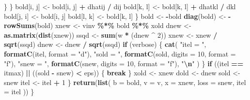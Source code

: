 \documentclass[
  12pt,
]{article}
\newenvironment{Shaded}{\begin{snugshade}}{\end{snugshade}}
\newcommand{\AttributeTok}[1]{\textcolor[rgb]{0.13,0.29,0.53}{#1}}
\newcommand{\ControlFlowTok}[1]{\textcolor[rgb]{0.13,0.29,0.53}{\textbf{#1}}}
\newcommand{\DecValTok}[1]{\textcolor[rgb]{0.00,0.00,0.81}{#1}}
\newcommand{\FunctionTok}[1]{\textcolor[rgb]{0.13,0.29,0.53}{\textbf{#1}}}
\newcommand{\NormalTok}[1]{#1}
\newcommand{\OtherTok}[1]{\textcolor[rgb]{0.56,0.35,0.01}{#1}}
\newcommand{\SpecialCharTok}[1]{\textcolor[rgb]{0.81,0.36,0.00}{\textbf{#1}}}
\newcommand{\StringTok}[1]{\textcolor[rgb]{0.31,0.60,0.02}{#1}}
\begin{document}
\begin{Shaded}
\begin{Highlighting}[]
\NormalTok{          \}}
\NormalTok{        \}}
\NormalTok{        bold[i, j] }\OtherTok{\textless{}{-}}\NormalTok{ bold[i, j] }\SpecialCharTok{+}\NormalTok{ dhatij }\SpecialCharTok{/}\NormalTok{ dij}
\NormalTok{        bold[k, l] }\OtherTok{\textless{}{-}}\NormalTok{ bold[k, l] }\SpecialCharTok{+}\NormalTok{ dhatkl }\SpecialCharTok{/}\NormalTok{ dkl}
\NormalTok{        bold[j, i] }\OtherTok{\textless{}{-}}\NormalTok{ bold[i, j]}
\NormalTok{        bold[l, k] }\OtherTok{\textless{}{-}}\NormalTok{ bold[k, l]}
\NormalTok{      \}}
\NormalTok{      bold }\OtherTok{\textless{}{-}} \SpecialCharTok{{-}}\NormalTok{bold}
      \FunctionTok{diag}\NormalTok{(bold) }\OtherTok{\textless{}{-}} \SpecialCharTok{{-}}\FunctionTok{rowSums}\NormalTok{(bold)}
\NormalTok{      xnew }\OtherTok{\textless{}{-}}\NormalTok{ vinv }\SpecialCharTok{\%*\%}\NormalTok{ bold }\SpecialCharTok{\%*\%}\NormalTok{ xold}
\NormalTok{      dnew }\OtherTok{\textless{}{-}} \FunctionTok{as.matrix}\NormalTok{(}\FunctionTok{dist}\NormalTok{(xnew))}
\NormalTok{      ssqd }\OtherTok{\textless{}{-}} \FunctionTok{sum}\NormalTok{(w }\SpecialCharTok{*}\NormalTok{ (dnew }\SpecialCharTok{\^{}} \DecValTok{2}\NormalTok{))}
\NormalTok{      xnew }\OtherTok{\textless{}{-}}\NormalTok{ xnew }\SpecialCharTok{/} \FunctionTok{sqrt}\NormalTok{(ssqd)}
\NormalTok{      dnew }\OtherTok{\textless{}{-}}\NormalTok{ dnew }\SpecialCharTok{/} \FunctionTok{sqrt}\NormalTok{(ssqd)}
      \ControlFlowTok{if}\NormalTok{ (verbose) \{}
        \FunctionTok{cat}\NormalTok{(}
          \StringTok{"itel = "}\NormalTok{,}
          \FunctionTok{formatC}\NormalTok{(itel, }\AttributeTok{format =} \StringTok{"d"}\NormalTok{),}
          \StringTok{"sold = "}\NormalTok{,}
          \FunctionTok{formatC}\NormalTok{(sold, }\AttributeTok{digits =} \DecValTok{10}\NormalTok{, }\AttributeTok{format =} \StringTok{"f"}\NormalTok{),}
          \StringTok{"snew = "}\NormalTok{,}
          \FunctionTok{formatC}\NormalTok{(snew, }\AttributeTok{digits =} \DecValTok{10}\NormalTok{, }\AttributeTok{format =} \StringTok{"f"}\NormalTok{),}
          \StringTok{"}\SpecialCharTok{\textbackslash{}n}\StringTok{"}
\NormalTok{        )}
\NormalTok{      \}}
      \ControlFlowTok{if}\NormalTok{ ((itel }\SpecialCharTok{==}\NormalTok{ itmax) }\SpecialCharTok{||}\NormalTok{ ((sold }\SpecialCharTok{{-}}\NormalTok{ snew) }\SpecialCharTok{\textless{}}\NormalTok{ eps)) \{}
        \ControlFlowTok{break}
\NormalTok{      \}}
\NormalTok{      xold }\OtherTok{\textless{}{-}}\NormalTok{ xnew}
\NormalTok{      dold }\OtherTok{\textless{}{-}}\NormalTok{ dnew}
\NormalTok{      sold }\OtherTok{\textless{}{-}}\NormalTok{ snew}
\NormalTok{      itel }\OtherTok{\textless{}{-}}\NormalTok{ itel }\SpecialCharTok{+} \DecValTok{1}
\NormalTok{    \}}
    \FunctionTok{return}\NormalTok{(}\FunctionTok{list}\NormalTok{(}
      \AttributeTok{b =}\NormalTok{ bold,}
      \AttributeTok{v =}\NormalTok{ v,}
      \AttributeTok{x =}\NormalTok{ xnew,}
      \AttributeTok{loss =}\NormalTok{ snew,}
      \AttributeTok{itel =}\NormalTok{ itel}
\NormalTok{    ))}
\NormalTok{  \}}
\end{Highlighting}
\end{Shaded}
\end{document}
